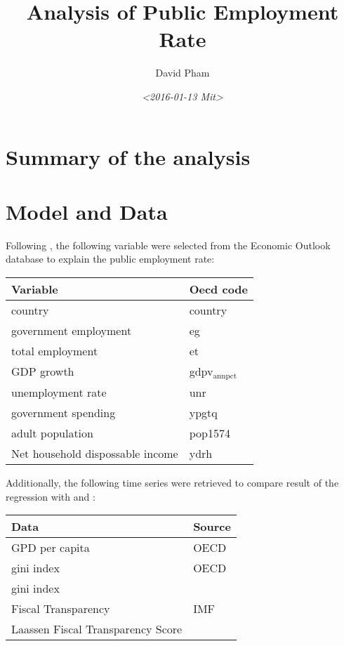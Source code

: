 \documentclass[a4paper]{article}
\author{David Pham}
\date{\textit{<2016-01-13 Mit>}}
\title{Analysis of Public Employment Rate}
\begin{document}
\maketitle
\tableofcontents


\section{Summary of the analysis}
\label{sec-1}

\section{Model and Data}
\label{sec-2}

Following \cite{aaskoven2015fiscal}, the following variable were selected from
the Economic Outlook database to explain the public employment rate:

\begin{center}
\begin{tabular}{ll}
Variable & Oecd code\\
\hline
country & country\\
government employment & eg\\
total employment & et\\
GDP growth & gdpv$_{\text{annpct}}$\\
unemployment rate & unr\\
government spending & ypgtq\\
adult population & pop1574\\
Net household dispossable income & ydrh\\
\hline
\end{tabular}
\end{center}

Additionally, the following time series were retrieved to compare result of the
regression with \cite{aaskoven2015fiscal} and \cite{alesina2000redistributive}:

\begin{center}
\begin{tabular}{ll}
Data & Source\\
\hline
GPD per capita & OECD\\
gini index & OECD\\
gini index & \cite{toth2014chapter}\\
Fiscal Transparency & IMF \cite{wang2015trends}\\
Laassen Fiscal Transparency Score & \cite{aaskoven2015fiscal}\\
\hline
\end{tabular}
\end{center}
\end{document}
